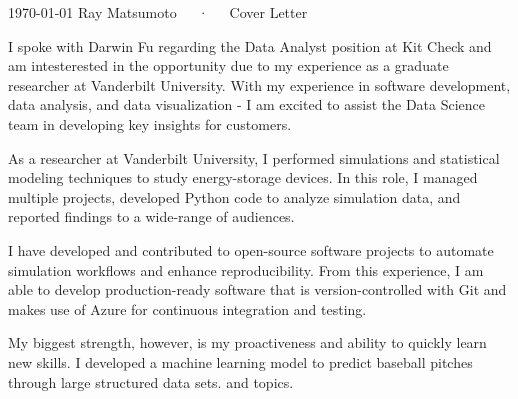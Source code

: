 \documentclass[11pt, a4paper]{awesome-cv}
\begin{document}
\makecvheader[R]

\makecvfooter
  {\today}
  {Ray Matsumoto~~~·~~~Cover Letter}
  {}

\makelettertitle

\begin{cvletter}

I spoke with Darwin Fu regarding the Data Analyst position at Kit Check and am
    intesterested in the opportunity due to my experience as a graduate
    researcher at Vanderbilt University.  With my experience in software
    development, data analysis, and data visualization - I am excited to
    assist the Data Science team in developing key insights for customers.

As a researcher at Vanderbilt University, I performed simulations and
    statistical modeling techniques to study energy-storage devices.  In this
    role, I managed multiple projects, developed Python code to analyze
    simulation data, and reported findings to a wide-range of audiences. 

    I have developed and contributed to open-source software projects to
    automate simulation workflows and enhance reproducibility.  From this
    experience, I am able to develop production-ready software that is
    version-controlled with Git and makes use of Azure for continuous
    integration and testing.

    My biggest strength, however, is my proactiveness and ability to quickly
    learn new skills.
    I developed a machine learning model to predict baseball pitches through
    large structured data sets.
    and topics. 
\end{cvletter}


\makeletterclosing
\end{document}
